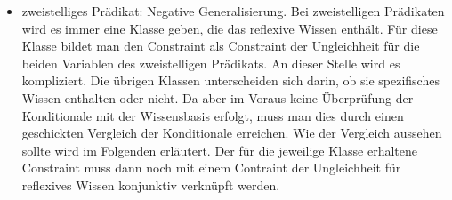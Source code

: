 \documentclass[a4paper, 11pt]{book}
\begin{document}
\begin{itemize}
\begin{itemize}
		\item zweistelliges Prädikat: Negative Generalisierung. Bei zweistelligen Prädikaten wird es immer eine Klasse geben, die das reflexive Wissen enthält. Für diese Klasse bildet man den Constraint als Constraint der Ungleichheit für die beiden Variablen des zweistelligen Prädikats. An dieser Stelle wird es kompliziert. Die übrigen Klassen unterscheiden sich darin, ob sie spezifisches Wissen enthalten oder nicht. Da aber im Voraus keine Überprüfung der Konditionale mit der Wissensbasis erfolgt, muss man dies durch einen geschickten Vergleich der Konditionale erreichen. Wie der Vergleich aussehen sollte wird im Folgenden erläutert. Der für die jeweilige Klasse erhaltene Constraint muss dann noch mit einem Contraint der Ungleichheit für reflexives Wissen konjunktiv verknüpft werden. 
		\end{itemize}


\end{itemize}
\end{document}
